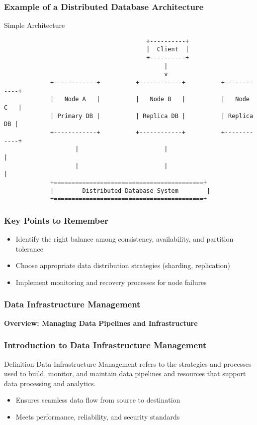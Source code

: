 \documentclass[aspectratio=169]{beamer}
\begin{document}
\begin{frame}[fragile]
    \frametitle{Example of a Distributed Database Architecture}
    \begin{block}{Simple Architecture}
        \begin{verbatim}
                                        +----------+
                                        |  Client  |
                                        +----------+
                                             |
                                             v
             +------------+          +------------+          +------------+
             |   Node A   |          |   Node B   |          |   Node C   |
             | Primary DB |          | Replica DB |          | Replica DB |
             +------------+          +------------+          +------------+
                    |                        |                        |
                    |                        |                        |
             +==========================================+
             |        Distributed Database System        |
             +==========================================+
        \end{verbatim}
    \end{block}
\end{frame}

\begin{frame}[fragile]
    \frametitle{Key Points to Remember}
    \begin{itemize}
        \item Identify the right balance among consistency, availability, and partition tolerance
        \item Choose appropriate data distribution strategies (sharding, replication)
        \item Implement monitoring and recovery processes for node failures
    \end{itemize}
\end{frame}

\begin{frame}
    \frametitle{Data Infrastructure Management}
    \textbf{Overview: Managing Data Pipelines and Infrastructure}
\end{frame}

\begin{frame}
    \frametitle{Introduction to Data Infrastructure Management}
    \begin{block}{Definition}
        Data Infrastructure Management refers to the strategies and processes used to build, monitor, and maintain data pipelines and resources that support data processing and analytics.
    \end{block}
    \begin{itemize}
        \item Ensures seamless data flow from source to destination
        \item Meets performance, reliability, and security standards
    \end{itemize}
\end{frame}
\end{document}
